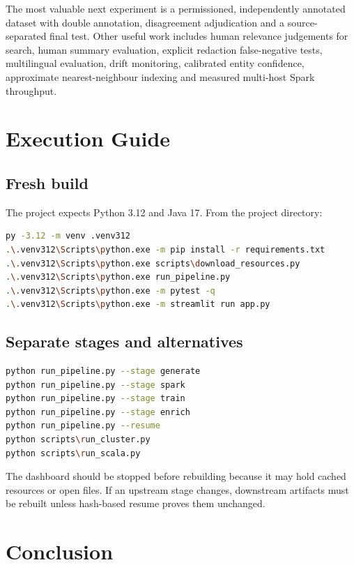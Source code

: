 \documentclass[12pt,a4paper]{report}
\begin{document}
The most valuable next experiment is a permissioned, independently annotated dataset with double annotation, disagreement adjudication and a source-separated final test. Other useful work includes human relevance judgements for search, human summary evaluation, explicit redaction false-negative tests, multilingual evaluation, drift monitoring, calibrated entity confidence, approximate nearest-neighbour indexing and measured multi-host Spark throughput.

\chapter{Execution Guide}

\section{Fresh build}

The project expects Python 3.12 and Java 17. From the project directory:

\begin{lstlisting}[language=bash]
py -3.12 -m venv .venv312
.\.venv312\Scripts\python.exe -m pip install -r requirements.txt
.\.venv312\Scripts\python.exe scripts\download_resources.py
.\.venv312\Scripts\python.exe run_pipeline.py
.\.venv312\Scripts\python.exe -m pytest -q
.\.venv312\Scripts\python.exe -m streamlit run app.py
\end{lstlisting}

\section{Separate stages and alternatives}

\begin{lstlisting}[language=bash]
python run_pipeline.py --stage generate
python run_pipeline.py --stage spark
python run_pipeline.py --stage train
python run_pipeline.py --stage enrich
python run_pipeline.py --resume
python scripts\run_cluster.py
python scripts\run_scala.py
\end{lstlisting}

The dashboard should be stopped before rebuilding because it may hold cached resources or open files. If an upstream stage changes, downstream artifacts must be rebuilt unless hash-based resume proves them unchanged.

\chapter{Conclusion}
\end{document}
